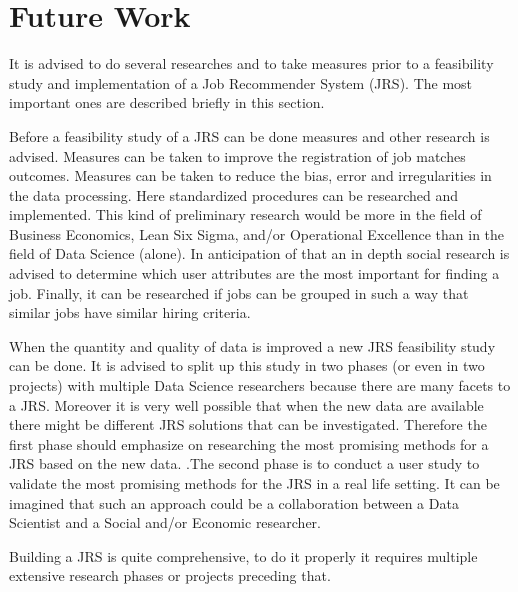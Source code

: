 \section{Future Work}
\label{sec:fut}

It is advised to do several researches and to take measures prior to a feasibility study and implementation of a Job Recommender System (JRS).
The most important ones are described briefly in this section.

Before a feasibility study of a JRS can be done measures and other research is advised.
Measures can be taken to improve the registration of job matches outcomes.
Measures can be taken to reduce the bias, error and irregularities in the data processing.
Here standardized procedures can be researched and implemented.
This kind of preliminary research would be more in the field of Business Economics, Lean Six Sigma, and/or Operational Excellence than in the field of Data Science (alone).
In anticipation of that an in depth social research is advised to determine which user attributes are the most important for finding a job.
Finally, it can be researched if jobs can be grouped in such a way that similar jobs have similar hiring criteria.

When the quantity and quality of data is improved a new JRS feasibility study can be done.
It is advised to split up this study  in two phases (or even in two  projects) with multiple Data Science researchers because there are many facets to a JRS. 
Moreover it is very well possible that when the new data are available there might be different JRS solutions that can be investigated.
Therefore the first phase should emphasize on researching the most promising methods for a JRS based on the new data.
.The second phase is to conduct a user study to validate the most promising methods for the JRS in a real life setting.
It can be imagined that such an approach could be a collaboration between a Data Scientist and a Social and/or Economic researcher.  

Building a JRS is quite comprehensive, to do it properly it requires multiple extensive research phases or projects preceding that.